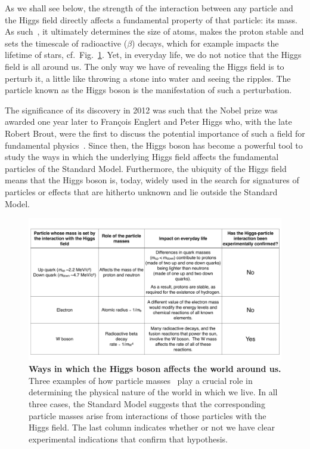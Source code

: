 \documentclass{article}
\begin{document}
As we shall see below, the strength of the interaction between any
particle and the Higgs field directly affects a fundamental property
of that particle: its mass.
As such~\cite{Quigg:2009xr},
it ultimately determines the size of atoms, makes the proton stable
and sets the timescale of radioactive ($\beta$) decays, which for example
impacts the lifetime of stars, cf.\ Fig.~\ref{fig:mass-impact}.
%
Yet, in everyday life, we do not notice that the Higgs field is
all around us.
%
The only way we have of revealing the Higgs field is to perturb it, a
little like throwing a stone into water and seeing the ripples.
%
The particle known as the Higgs boson is the manifestation of such a
perturbation. 

The significance of its discovery in 2012 
%
was such that 
%
the Nobel prize was awarded one year later to François Englert
and Peter Higgs who, with the late Robert Brout, were the first to
discuss the potential importance of such a field for fundamental
physics~\cite{Englert:1964et,Higgs:1964ia,Higgs:1964pj}.
%
Since then, the Higgs boson has become a powerful tool to study the
ways in which the underlying Higgs field affects the fundamental
particles of the Standard Model.
%
Furthermore, the ubiquity of the Higgs field means that the Higgs
boson is, today, widely used in the search for signatures of particles or
effects that are hitherto unknown and lie outside the Standard Model.


%
\begin{figure}[t]
  \centering
   \includegraphics[width=\textwidth,page=1]{figs/Fig1-final.pdf}
  \caption{{\bf Ways in which the Higgs boson affects the world around us.}
    Three examples of how particle masses~\cite{ParticleDataGroup:2020ssz} play a crucial role in determining
    the physical nature of the world in which we live.
    In all three cases, the Standard Model suggests that the
    corresponding particle
    masses arise from interactions of those particles with the Higgs
    field. 
    The last column indicates whether or not we have clear
    experimental indications that confirm that hypothesis.
  }  
  \label{fig:mass-impact}
\end{figure}
\end{document}
